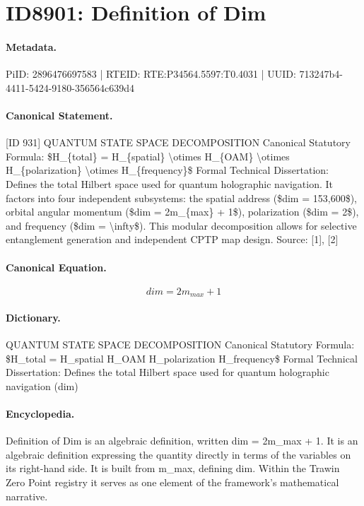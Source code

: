 \section*{ID8901: Definition of Dim}
\paragraph{Metadata.}
PiID: 2896476697583 | RTEID: RTE:P34564.5597:T0.4031 | UUID: 713247b4-4411-5424-9180-356564c639d4

\paragraph{Canonical Statement.}
[ID 931] QUANTUM STATE SPACE DECOMPOSITION Canonical Statutory Formula: \$H\_\{total\} = H\_\{spatial\} \textbackslash{}otimes H\_\{OAM\} \textbackslash{}otimes H\_\{polarization\} \textbackslash{}otimes H\_\{frequency\}\$ Formal Technical Dissertation: Defines the total Hilbert space used for quantum holographic navigation. It factors into four independent subsystems: the spatial address (\$dim = 153,600\$), orbital angular momentum (\$dim = 2m\_\{max\} + 1\$), polarization (\$dim = 2\$), and frequency (\$dim = \textbackslash{}infty\$). This modular decomposition allows for selective entanglement generation and independent CPTP map design. Source: [1], [2]

\paragraph{Canonical Equation.}
\[
dim = 2m_{max} + 1
\]

\paragraph{Dictionary.}
QUANTUM STATE SPACE DECOMPOSITION Canonical Statutory Formula: \$H\_total = H\_spatial H\_OAM H\_polarization H\_frequency\$ Formal Technical Dissertation: Defines the total Hilbert space used for quantum holographic navigation (dim)

\paragraph{Encyclopedia.}
Definition of Dim is an algebraic definition, written dim = 2m\_max + 1. It is an algebraic definition expressing the quantity directly in terms of the variables on its right-hand side. It is built from m\_max, defining dim. Within the Trawin Zero Point registry it serves as one element of the framework's mathematical narrative.

